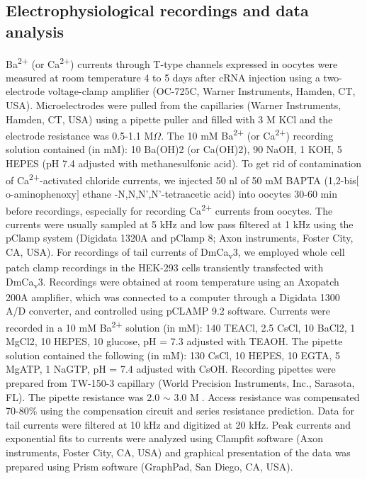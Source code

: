 \subsection*{Electrophysiological recordings and data analysis}

Ba\textsuperscript{2+} (or Ca\textsuperscript{2+}) currents through T-type channels expressed in oocytes were measured at room temperature 4 to 5 days after cRNA injection using a two-electrode voltage-clamp amplifier (OC-725C, Warner Instruments, Hamden, CT, USA).
Microelectrodes were pulled from the capillaries (Warner Instruments, Hamden, CT, USA) using a pipette puller and filled with 3 M KCl and the electrode resistance was 0.5-1.1 M$\Omega$.
The 10 mM Ba\textsuperscript{2+} (or Ca\textsuperscript{2+}) recording solution contained (in mM): 10 Ba(OH)2 (or Ca(OH)2), 90 NaOH, 1 KOH, 5 HEPES (pH 7.4 adjusted with methanesulfonic acid).
To get rid of contamination of Ca\textsuperscript{2+}-activated chloride currents, we injected 50 nl of 50 mM BAPTA (1,2-bis$[$o-aminophenoxy$]$ ethane -N,N,N\textquoteright,N\textquoteright-tetraacetic acid) into oocytes 30-60 min before recordings, especially for recording Ca\textsuperscript{2+} currents from oocytes.
The currents were usually sampled at 5 kHz and low pass filtered at 1 kHz using the pClamp system (Digidata 1320A and pClamp 8; Axon instruments, Foster City, CA, USA). 
For recordings of tail currents of DmCa\textsubscript{v}3, we employed whole cell patch clamp recordings in the HEK-293 cells transiently transfected with DmCa\textsubscript{v}3. 
Recordings were obtained at room temperature using an Axopatch 200A amplifier, which was connected to a computer through a Digidata 1300 A/D converter, and controlled using pCLAMP 9.2 software. 
Currents were recorded in a 10 mM Ba\textsuperscript{2+} solution (in mM): 140 TEACl, 2.5 CsCl, 10 BaCl2, 1 MgCl2, 10 HEPES, 10 glucose, pH = 7.3 adjusted with TEAOH. The pipette solution contained the following (in mM): 130 CsCl, 10 HEPES, 10 EGTA, 5 MgATP, 1 NaGTP, pH = 7.4 adjusted with CsOH. 
Recording pipettes were prepared from TW-150-3 capillary (World Precision Instruments, Inc., Sarasota, FL).
 The pipette resistance was 2.0 $\sim$ 3.0 M. Access resistance was compensated 70-80\%{} using the compensation circuit and series resistance prediction. 
Data for tail currents were filtered at 10 kHz and digitized at 20 kHz. 
Peak currents and exponential fits to currents were analyzed using Clampfit software (Axon instruments, Foster City, CA, USA) and graphical presentation of the data was prepared using Prism software (GraphPad, San Diego, CA, USA). 
